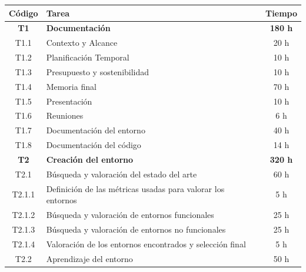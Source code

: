 \begin{table}[h]
	\begin{center}
		\begin{tabular}{| c | l | c |}
			\hline
			\textbf{Código} & \textbf{Tarea}                                                 & \textbf{Tiempo} \\ \hline
			\textbf{T1}     & \textbf{Documentación}                                         & \textbf{180 h}  \\ \hline
			T1.1            & Contexto y Alcance                                             & 20 h            \\
			T1.2            & Planificación Temporal                                         & 10 h            \\
			T1.3            & Presupuesto y sostenibilidad                                   & 10 h            \\
			T1.4            & Memoria final                                                  & 70 h            \\
			T1.5            & Presentación                                                   & 10 h            \\
			T1.6            & Reuniones                                                      & 6 h             \\
			T1.7            & Documentación del entorno                                      & 40 h            \\
			T1.8            & Documentación del código                                       & 14 h            \\
			\hline
			\textbf{T2}     & \textbf{Creación del entorno}                                  & \textbf{320 h}  \\ \hline
			T2.1            & Búsqueda y valoración del estado del arte                      & 60 h            \\ \hline
			T2.1.1          & Definición de las métricas usadas para valorar los entornos    & 5 h             \\
			T2.1.2          & Búsqueda y valoración de entornos funcionales                  & 25 h            \\
			T2.1.3          & Búsqueda y valoración de entornos no funcionales               & 25 h            \\
			T2.1.4          & Valoración de los entornos encontrados y selección final       & 5 h             \\ \hline
			T2.2            & Aprendizaje del entorno                                        & 50 h            \\ \hline

\end{tabular}
\end{center}
\end{table}

